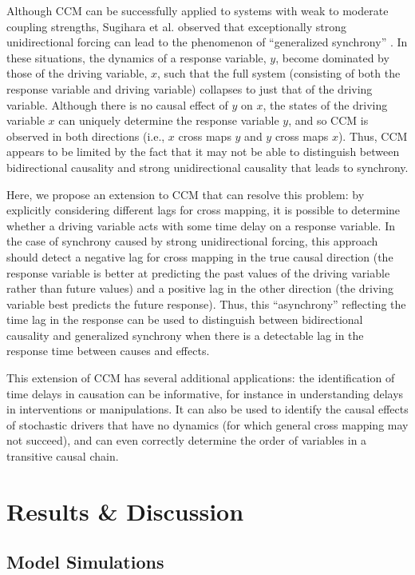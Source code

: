 Although CCM can be successfully applied to systems with weak to moderate coupling strengths, Sugihara et al. observed that exceptionally strong unidirectional forcing can lead to the phenomenon of ``generalized synchrony'' \cite{Rulkov_1995}. In these situations, the dynamics of a response variable, $y$, become dominated by those of the driving variable, $x$, such that the full system (consisting of both the response variable and driving variable) collapses to just that of the driving variable. Although there is no causal effect of $y$ on $x$, the states of the driving variable $x$ can uniquely determine the response variable $y$, and so CCM is observed in both directions (i.e., $x$ cross maps $y$ and $y$ cross maps $x$). Thus, CCM appears to be limited by the fact that it may not be able to distinguish between bidirectional causality and strong unidirectional causality that leads to synchrony.

Here, we propose an extension to CCM that can resolve this problem: by explicitly considering different lags for cross mapping, it is possible to determine whether a driving variable acts with some time delay on a response variable. In the case of synchrony caused by strong unidirectional forcing, this approach should detect a negative lag for cross mapping in the true causal direction (the response variable is better at predicting the past values of the driving variable rather than future values) and a positive lag in the other direction (the driving variable best predicts the future response). Thus, this ``asynchrony'' reflecting the time lag in the response can be used to distinguish between bidirectional causality and generalized synchrony when there is a detectable lag in the response time between causes and effects.

This extension of CCM has several additional applications: the identification of time delays in causation can be informative, for instance in understanding delays in interventions or manipulations. It can also be used to identify the causal effects of stochastic drivers that have no dynamics (for which general cross mapping may not succeed), and can even correctly determine the order of variables in a transitive causal chain.

\section{Results \& Discussion}

\subsection{Model Simulations}

